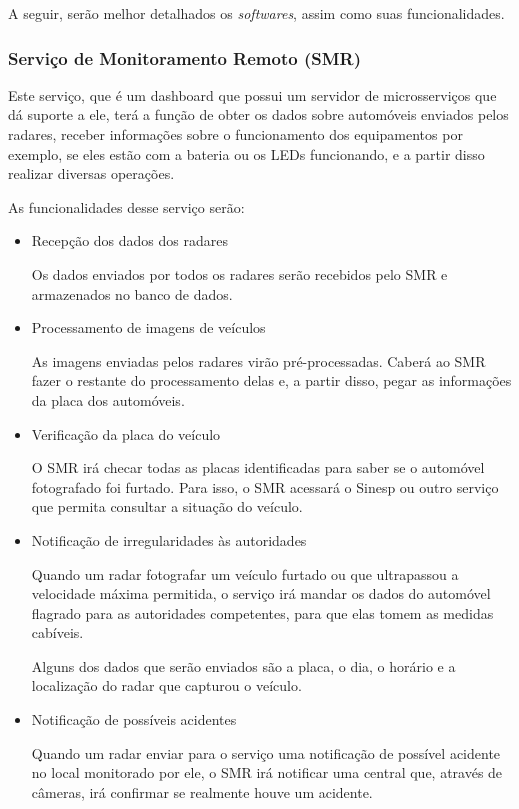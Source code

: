  A seguir, serão melhor detalhados os \emph{softwares}, assim como suas funcionalidades.

\subsubsection{Serviço de Monitoramento Remoto (SMR)}
Este serviço, que é um dashboard que possui um servidor de microsserviços que dá suporte a ele, terá a função de obter os dados sobre automóveis enviados pelos radares, receber informações sobre o funcionamento dos equipamentos por exemplo, se eles estão com a bateria ou os LEDs funcionando, e a partir disso realizar diversas operações.

As funcionalidades desse serviço serão:

\begin{itemize}
\item{Recepção dos dados dos radares}

Os dados enviados por todos os radares serão recebidos pelo SMR e armazenados no banco de dados.

\item{Processamento de imagens de veículos}

As imagens enviadas pelos radares virão pré-processadas. Caberá ao SMR fazer o restante do processamento delas e, a partir disso, pegar as informações da placa dos automóveis.

\item{Verificação da placa do veículo}

O SMR irá checar todas as placas identificadas para saber se o automóvel fotografado foi furtado. Para isso, o SMR acessará o Sinesp ou outro serviço que permita consultar a situação do veículo.

\item{Notificação de irregularidades às autoridades}

Quando um radar fotografar um veículo furtado ou que ultrapassou a velocidade máxima permitida, o serviço irá mandar os dados do automóvel flagrado para as autoridades competentes, para que elas tomem as medidas cabíveis.

Alguns dos dados que serão enviados são a placa, o dia, o horário e a localização do radar que capturou o veículo.

\item{Notificação de possíveis acidentes}

Quando um radar enviar para o serviço uma notificação de possível acidente no local monitorado por ele, o SMR irá notificar uma central que, através de câmeras, irá confirmar se realmente houve um acidente.


\end{itemize}
